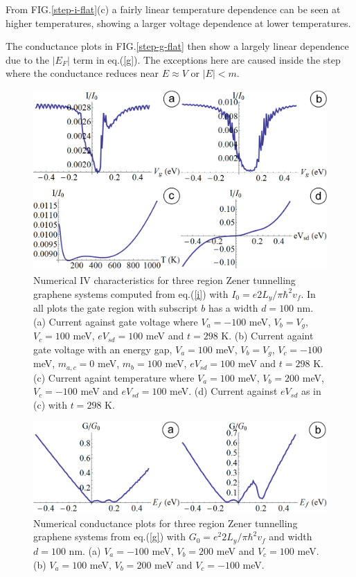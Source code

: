 \documentclass[prl,twocolumn,aps,superscriptaddress,floatfix,10pt]{revtex4}
\begin{document}
	From FIG.\ref{step-i-flat}(c) a fairly linear temperature dependence can be seen at higher temperatures, showing a larger voltage dependence at lower temperatures.

	The conductance plots in FIG.\ref{step-g-flat} then show a largely linear dependence due to the $|E_{F}|$ term in eq.(\ref{g}). The exceptions here are caused inside the step where the conductance reduces near $E \approx V$ or $|E|<m$.

\begin{figure}
	\includegraphics[scale=0.2]{asy-i-flat}
	\caption{Numerical IV characteristics for three region Zener tunnelling graphene systems computed from eq.(\ref{i}) with $I_{0}=e2L_{y}/\pi\hbar^{2}v_{f}$. In all plots the gate region with subscript $b$ has a width $d=100$ nm. (a) Current against gate voltage where $V_{a}=-100$ meV, $V_{b}=V_{g}$, $V_{c}=100$ meV, $eV_{sd}=100$ meV and $t=298$ K. (b) Current againt gate voltage with an energy gap, $V_{a}=100$ meV, $V_{b}=V_{g}$, $V_{c}=-100$ meV, $m_{a,c}=0$ meV, $m_{b}=100$ meV, $eV_{sd}=100$ meV and $t=298$ K. (c) Current againt temperature where $V_{a}=100$ meV, $V_{b}=200$ meV, $V_{c}=-100$ meV and $eV_{sd}=100$ meV. (d) Current against $eV_{sd}$ as in (c) with $t=298$ K.}
	\label{asy-i-flat}
\end{figure}

\begin{figure}
	\includegraphics[scale=0.2]{asy-g-flat}
	\caption{Numerical conductance plots for three region Zener tunnelling graphene systems from eq.(\ref{g}) with $G_{0}=e^{2}2L_{y}/\pi\hbar^{2}v_{f}$ and  width $d=100$ nm. (a) $V_{a}=-100$ meV, $V_{b}=200$ meV and $V_{c}=100$ meV. (b) $V_{a}=100$ meV, $V_{b}=200$ meV and $V_{c}=-100$ meV.}
	\label{asy-g-flat}
\end{figure}
\end{document}
